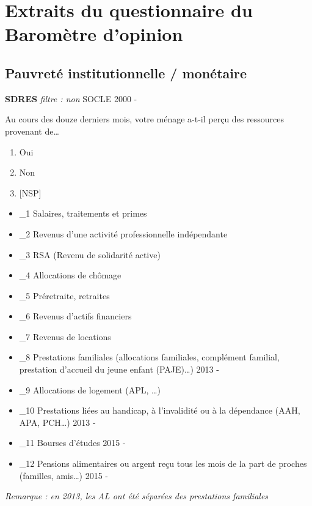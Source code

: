 \documentclass[12pt,a4paper]{reedthesis}
\providecommand{\tightlist}{%
  \setlength{\itemsep}{0pt}\setlength{\parskip}{0pt}}
\begin{document}
\appendix

\hypertarget{annexequestio}{%
\chapter{Extraits du questionnaire du Baromètre d'opinion}\label{annexequestio}}

\hypertarget{pauvretuxe9-institutionnelle-monuxe9taire}{%
\section{Pauvreté institutionnelle / monétaire}\label{pauvretuxe9-institutionnelle-monuxe9taire}}

\textbf{SDRES} \emph{filtre : non} SOCLE 2000 -

Au cours des douze derniers mois, votre ménage a-t-il perçu des ressources provenant de\ldots{}
\begin{enumerate}
\def\labelenumi{\arabic{enumi}.}
\tightlist
\item
  Oui
\item
  Non
\item
  {[}NSP{]}
\end{enumerate}
\begin{itemize}
\tightlist
\item
  \_1 Salaires, traitements et primes
\item
  \_2 Revenus d'une activité professionnelle indépendante
\item
  \_3 RSA (Revenu de solidarité active)
\item
  \_4 Allocations de chômage
\item
  \_5 Préretraite, retraites
\item
  \_6 Revenus d'actifs financiers
\item
  \_7 Revenus de locations
\item
  \_8 Prestations familiales (allocations familiales, complément familial, prestation d'accueil du jeune enfant (PAJE)\ldots) 2013 -
\item
  \_9 Allocations de logement (APL, \ldots)
\item
  \_10 Prestations liées au handicap, à l'invalidité ou à la dépendance (AAH, APA, PCH\ldots) 2013 -
\item
  \_11 Bourses d'études 2015 -
\item
  \_12 Pensions alimentaires ou argent reçu tous les mois de la part de proches (familles, amis\ldots) 2015 -
\end{itemize}
\emph{Remarque : en 2013, les AL ont été séparées des prestations familiales}
\end{document}
